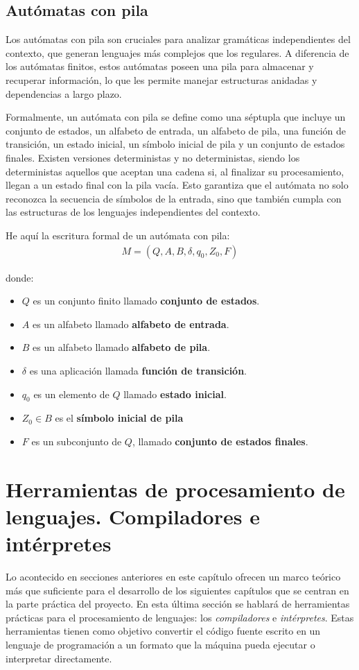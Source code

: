 \subsection{Autómatas con pila}\label{subsection:automatPila}
Los autómatas con pila son cruciales para analizar gramáticas independientes del contexto, que generan lenguajes más complejos que los regulares. A diferencia de los autómatas finitos, estos autómatas poseen una pila para almacenar y recuperar información, lo que les permite manejar estructuras anidadas y dependencias a largo plazo.

Formalmente, un autómata con pila se define como una séptupla que incluye un conjunto de estados, un alfabeto de entrada, un alfabeto de pila, una función de transición, un estado inicial, un símbolo inicial de pila y un conjunto de estados finales. Existen versiones deterministas y no deterministas, siendo los deterministas aquellos que aceptan una cadena si, al finalizar su procesamiento, llegan a un estado final con la pila vacía. Esto garantiza que el autómata no solo reconozca la secuencia de símbolos de la entrada, sino que también cumpla con las estructuras de los lenguajes independientes del contexto.

\noindent
He aquí la escritura formal de un autómata con pila:
\begin{align*}
    M = (Q,A,B,\delta,q_0,Z_0,F)
\end{align*}

\noindent
donde:
\begin{itemize}
    \item $Q$ es un conjunto finito llamado \textbf{conjunto de estados}.
    \item $A$ es un alfabeto llamado \textbf{alfabeto de entrada}.
    \item $B$ es un alfabeto llamado \textbf{alfabeto de pila}.
    \item $\delta$ es una aplicación llamada \textbf{función de transición}.
    \item $q_0$ es un elemento de $Q$ llamado \textbf{estado inicial}.
    \item $Z_0 \in B$ es el \textbf{símbolo inicial de pila}
    \item $F$ es un subconjunto de $Q$, llamado \textbf{conjunto de estados finales}.
\end{itemize}

\section{Herramientas de procesamiento de lenguajes. Compiladores e intérpretes}\label{section:compiladores}
Lo acontecido en secciones anteriores en este capítulo ofrecen un marco teórico más que suficiente para el desarrollo de los siguientes capítulos que se centran en la parte práctica del proyecto. En esta última sección se hablará de herramientas prácticas para el procesamiento de lenguajes: los \textit{compiladores} e \textit{intérpretes}. Estas herramientas tienen como objetivo convertir el código fuente escrito en un lenguaje de programación a un formato que la máquina pueda ejecutar o interpretar directamente.

